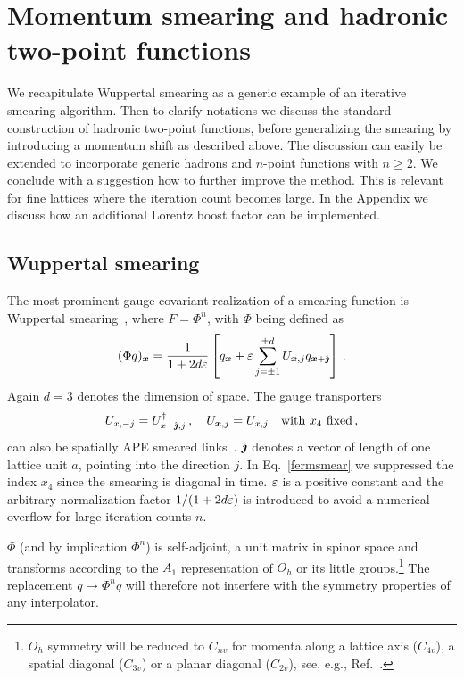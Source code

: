 \section{Momentum smearing and hadronic two-point functions}
\label{sec:wuppertal}
We recapitulate Wuppertal smearing as a generic example of
an iterative smearing algorithm.
Then to clarify notations we discuss the standard construction
of hadronic two-point functions,
before generalizing the smearing by introducing a momentum shift as described
above. The discussion can easily be extended to incorporate generic hadrons and
$n$-point functions with $n\geq 2$. 
We conclude with a suggestion how to
further improve the method. This is relevant for fine lattices
where the iteration count becomes large. In the Appendix
we discuss how an additional Lorentz boost factor can be implemented.
\subsection{Wuppertal smearing}
\label{sec:wup}
The most prominent gauge covariant realization of a smearing function is
Wuppertal smearing~\cite{Gusken:1989ad,Gusken:1989qx}, where
$F=\Phi^n$, with $\Phi$ being defined as
\begin{equation}
(\Phi q)_{\boldsymbol{x}} = \frac{1}{1+2d\varepsilon} \left[q_{\boldsymbol{x}}+\varepsilon \sum_{j=\pm 1}^{\pm d} U_{\boldsymbol{x},j} q_{\boldsymbol{x}+\hat{\boldsymbol{\jmath}}}\right]\,. \label{fermsmear}
\end{equation}
Again $d=3$ denotes the dimension of space. The gauge
transporters
\begin{align}\label{eq:gausssmear}
U_{x,-j} = U^{\dagger}_{x-\hat{\boldsymbol{\jmath}},j}\,,\quad U_{\boldsymbol{x},j}=U_{x,j}\quad\text{with}\,\, x_4\,\,\text{fixed}\,,
\end{align}
can also be spatially APE smeared
links~\cite{Falcioni:1984ei,Alexandrou:1990dq,Bali:2005fu}.
$\hat{\boldsymbol{\jmath}}$ denotes a vector of length of one lattice unit $a$, pointing
into the direction $j$. In Eq.~\eqref{fermsmear} we suppressed the index $x_4$
since the smearing is diagonal in time. $\varepsilon$ is a positive
constant and the arbitrary normalization factor $1/(1+2d\varepsilon)$
is introduced to avoid a numerical overflow for large iteration
counts $n$.

$\Phi$ (and by implication $\Phi^n$) is self-adjoint, a unit matrix
in spinor space and transforms according to the $A_1$ representation of $O_h$
or its little groups.\footnote{$O_h$ symmetry will be reduced to $C_{nv}$
for momenta along a lattice axis ($C_{4v}$), a spatial diagonal ($C_{3v}$)
or a planar diagonal ($C_{2v}$), see, e.g., Ref.~\cite{Hamermesh:100343}.}
The replacement $q\mapsto \Phi^n q$ will therefore not interfere with
the symmetry properties of any interpolator.


